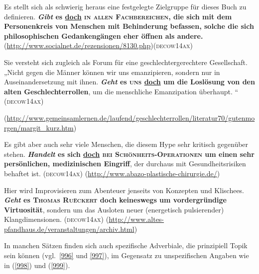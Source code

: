 {\begin{exe}
	\ex\label{991} 

	Es stellt sich als schwierig heraus eine festgelegte Zielgruppe für dieses Buch zu definieren. \textbf{\textit{Gibt} es \ul{doch} \textsc{in 		allen Fachbereichen}, die sich mit dem Personenkreis von Menschen mit Behinderung befassen, solche die sich philosophischen Gedankengängen eher öffnen 		als andere.}\newline
	{\scriptsize(\url{http://www.socialnet.de/rezensionen/8130.php})}\hfill\hbox{\scshape(decow14ax)}
\end{exe}

\begin{exe}
	\ex\label{992} 

	Sie versteht sich zugleich als Forum für eine geschlechtergerechtere Gesellschaft. „Nicht gegen die Männer können wir uns emanzipieren, sondern 		nur in Auseinandersetzung mit ihnen. \textbf{\textit{Geht} es \textsc{uns} \ul{doch} um die Loslösung von den alten Geschlechterrollen}, um die 		menschliche Emanzipation überhaupt.	“ 	
	\hfill\hbox{\scshape(decow14ax)}
	\begin{sloppypar}
	{\scriptsize(\url{http://www.gemeinsamlernen.de/laufend/geschlechterrollen/literatur70/gutenmorgen/margit\_kurz.htm})}\end{sloppypar}
\end{exe}

\begin{exe}
	\ex\label{993} 

	Es gibt aber auch sehr viele Menschen, die diesem Hype sehr kritisch gegenüber stehen. \textbf{\textit{Handelt} es sich \ul{doch} \textsc{bei 		Schönheits-Operationen} um einen sehr persönlichen, medizinischen Eingriff}, der durchaus mit Gesundheitsrisiken behaftet ist.  		
	\hfill\hbox{\scshape(decow14ax)}
	\newline
	{\scriptsize(\url{http://www.abazo-plastische-chirurgie.de/})}
\end{exe}							               
						                			                      
\begin{exe}
	\ex\label{995} 

	Hier wird Improvisieren zum Abenteuer jenseits von Konzepten und Klischees. \textbf{\textit{Geht} es \textsc{Thomas Ruëckert} doch keineswegs um 			vordergründige Virtuosität}, sondern um das Ausloten neuer (energetisch pulsierender) Klangdimensionen.		 		
	\hfill\hbox{\scshape(decow14ax)}
	\newline
	{\scriptsize(\url{http://www.altes-pfandhaus.de/veranstaltungen/archiv.html})}
\end{exe}
In manchen Sätzen finden sich auch spezifische Adverbiale, die prinzipiell Topik sein können (vgl.\ \ref{996} und \ref{997}), im Gegensatz zu unspezifischen Angaben wie in (\ref{998}) und (\ref{999}).

}
